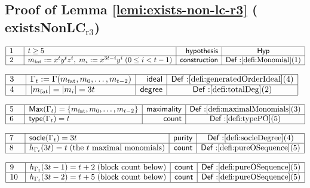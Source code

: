 \documentclass[11pt,reqno]{amsart}
\begin{document}
\medskip


\subsection*{Proof of Lemma \protect\ref{lemi:exists-non-lc-r3} (\textsf{%
existsNonLC}$_{\mathrm{r3}}$)}

\noindent$%
\begin{array}{|m{0.5cm}|l|r|c|}
\hline
1 & t\ge5 & \mathsf{hypothesis} & \mathsf{Hyp} \\ \hline
2 & m_{\mathrm{fat}}:=x^{t}y^{t}z^{t},\;m_{i}:=x^{3t-i}y^{i}\;(0\le i<t-1) & 
\mathsf{construction} & \mathsf{Def:}\ref{defi:Monomial}(1) \\ \hline
\end{array}%
$

\nointerlineskip\noindent$%
\begin{array}{|m{0.5cm}|l|r|c|}
\hline
3 & \Gamma_{t}:=\Gamma(m_{\mathrm{fat}},m_{0},\dots,m_{t-2}) & \mathsf{ideal}
& \mathsf{Def:}\ref{defi:generatedOrderIdeal}(4) \\ \hline
4 & |m_{\mathrm{fat}}|=|m_{i}|=3t & \mathsf{degree} & \mathsf{Def:}\ref%
{defi:totalDeg}(2) \\ \hline
\end{array}%
$

\nointerlineskip\noindent$%
\begin{array}{|m{0.5cm}|l|r|c|}
\hline
5 & \mathsf{Max}(\Gamma_{t})=\{m_{\mathrm{fat}},m_{0},\dots,m_{t-2}\} & 
\mathsf{maximality} & \mathsf{Def:}\ref{defi:maximalMonomials}(3) \\ \hline
6 & \mathsf{type}(\Gamma_{t})=t & \mathsf{count} & \mathsf{Def:}\ref%
{defi:typePO}(5) \\ \hline
\end{array}%
$

\nointerlineskip\noindent$%
\begin{array}{|m{0.5cm}|l|r|c|}
\hline
7 & \mathsf{socle}(\Gamma_{t})=3t & \mathsf{purity} & \mathsf{Def:}\ref%
{defi:socleDegree}(4) \\ \hline
8 & h_{\Gamma_{t}}(3t)=t\;\text{(the $t$ maximal monomials)} & \mathsf{count}
& \mathsf{Def:}\ref{defi:pureOSequence}(5) \\ \hline
\end{array}%
$

\nointerlineskip\noindent$%
\begin{array}{|m{0.5cm}|l|r|c|}
\hline
9 & h_{\Gamma_{t}}(3t-1)=t+2\;\text{(block count below)} & \mathsf{count} & 
\mathsf{Def:}\ref{defi:pureOSequence}(5) \\ \hline
10 & h_{\Gamma_{t}}(3t-2)=t+5\;\text{(block count below)} & \mathsf{count} & 
\mathsf{Def:}\ref{defi:pureOSequence}(5) \\ \hline
\end{array}%
$
\end{document}
